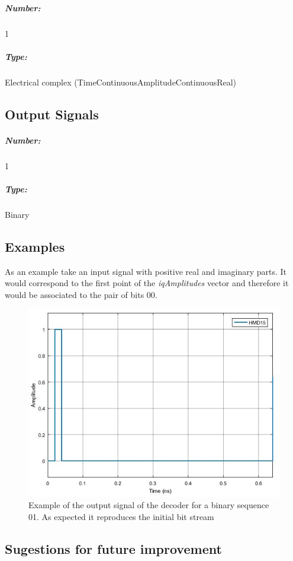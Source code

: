 \subparagraph*{Number:} 1

\subparagraph*{Type:} Electrical complex (TimeContinuousAmplitudeContinuousReal)

\subsection*{Output Signals}

\subparagraph*{Number:} 1

\subparagraph*{Type:} Binary

\subsection*{Examples}

As an example take an input signal with positive real and imaginary parts. It would correspond to the first point of the \textit{iqAmplitudes} vector and therefore it would be associated to the  pair of bits $00$.

\begin{figure}[h]
	\centering
	\includegraphics[width=\textwidth]{./lib/decoder/figures/Decoder_output}
	\caption{Example of the output signal of the decoder for a binary sequence 01. As expected it reproduces the initial bit stream}\label{Decoder_output}
\end{figure}

\subsection*{Sugestions for future improvement}
